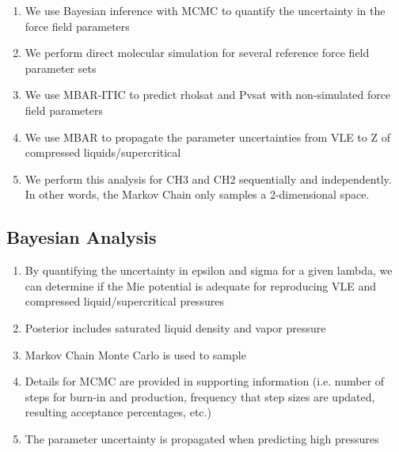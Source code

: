 \documentclass[preprint,letterpaper,floatfix,citeautoscript,aip,jcp]{revtex4-1}
\begin{document}
\begin{enumerate}
	\item We use Bayesian inference with MCMC to quantify the uncertainty in the force field parameters
	\item We perform direct molecular simulation for several reference force field parameter sets
	\item We use MBAR-ITIC to predict rholsat and Pvsat with non-simulated force field parameters
	\item We use MBAR to propagate the parameter uncertainties from VLE to Z of compressed liquids/supercritical
	\item We perform this analysis for CH3 and CH2 sequentially and independently. In other words, the Markov Chain only samples a 2-dimensional space. %
\end{enumerate}

\subsection{Bayesian Analysis}

\begin{enumerate}
	\item By quantifying the uncertainty in epsilon and sigma for a given lambda, we can determine if the Mie potential is adequate for reproducing VLE and compressed liquid/supercritical pressures
	\item Posterior includes saturated liquid density and vapor pressure
	\item Markov Chain Monte Carlo is used to sample %
	\item Details for MCMC are provided in supporting information (i.e. number of steps for burn-in and production, frequency that step sizes are updated, resulting acceptance percentages, etc.)
	\item The parameter uncertainty is propagated when predicting high pressures
\end{enumerate}
\end{document}
